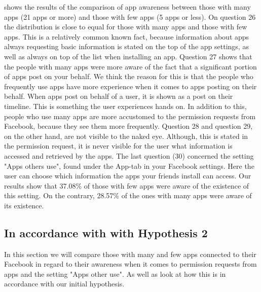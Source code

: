  shows the results of the comparison of app awareness between those with many apps (21 apps or more) and those with few apps (5 apps or less). On question 26 the distribution is close to equal for those with many apps and those with few apps. This is a relatively common known fact, because information about apps always requesting basic information is stated on the top of the app settings, as well as always on top of the list when installing an app. Question 27 shows that the people with many apps were more aware of the fact that a significant portion of apps post on your behalf. We think the reason for this is that the people who frequently use apps have more experience when it comes to apps posting on their behalf. When apps post on behalf of a user, it is shown as a post on their timeline. This is something the user experiences hands on. In addition to this, people who use many apps are more accustomed to the permission requests from Facebook, because they see them more frequently. Question 28 and question 29, on the other hand, are not visible to the naked eye. Although, this is stated in the permission request, it is never visible for the user what information is accessed and retrieved by the apps. The last question (30) concerned the setting "Apps others use", found under the App-tab in your Facebook settings. Here the user can choose which information the apps your friends install can access. Our results show that 37.08\% of those with few apps were aware of the existence of this setting. On the contrary, 28.57\% of the ones with many apps were aware of its existence. 


\subsection{In accordance with with Hypothesis 2}
In this section we will compare those with many and few apps connected to their Facebook in regard to their awareness when it comes to permission requests from apps and the setting "Apps other use". As well as look at how this is in accordance with our initial hypothesis. 

